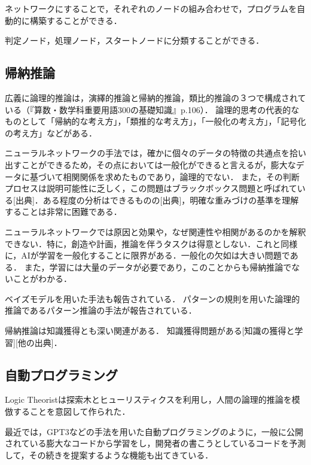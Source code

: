 \documentclass[exploratorypaper]{jsaiart} %
\begin{document}
ネットワークにすることで，それぞれのノードの組み合わせで，プログラムを自動的に構築することができる．

判定ノード，処理ノード，スタートノードに分類することができる．

\subsection{帰納推論}
広義に論理的推論は，演繹的推論と帰納的推論，類比的推論の３つで構成されている（『算数・数学科重要用語300の基礎知識』p.106）．
論理的思考の代表的なものとして「帰納的な考え方」，「類推的な考え方」，「一般化の考え方」，「記号化の考え方」などがある\cite{saito:11}．

ニューラルネットワークの手法では，確かに個々のデータの特徴の共通点を拾い出すことができるため，その点においては一般化ができると言えるが，膨大なデータに基づいて相関関係を求めたものであり，論理的でない．
また，その判断プロセスは説明可能性に乏しく，この問題はブラックボックス問題と呼ばれている[出典]．ある程度の分析はできるものの[出典]，明確な重みづけの基準を理解することは非常に困難である．

ニューラルネットワークでは原因と効果や，なぜ関連性や相関があるのかを解釈できない．特に，創造や計画，推論を伴うタスクは得意としない．これと同様に，AIが学習を一般化することに限界がある．一般化の欠如は大きい問題である．
また，学習には大量のデータが必要であり，このことからも帰納推論でないことがわかる．

ベイズモデルを用いた手法も報告されている\cite{TENENBAUM2006}．
パターンの規則を用いた論理的推論であるパターン推論の手法が報告されている\cite{tsukimoto:00}\cite{sudo:07}．


帰納推論は知識獲得とも深い関連がある．
知識獲得問題がある\cite{KnowledgeAI}[知識の獲得と学習][他の出典]．
\subsection{自動プログラミング}
Logic Theorist\cite{LogicTheorist}は探索木とヒューリスティクスを利用し，人間の論理的推論を模倣することを意図して作られた．

最近では，GPT3\cite{gpt3}などの手法を用いた自動プログラミングのように，一般に公開されている膨大なコードから学習をし，開発者の書こうとしているコードを予測して，その続きを提案するような機能も出てきている\cite{copilot}．
\end{document}

